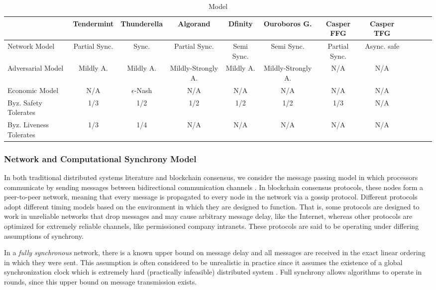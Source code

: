 \documentclass[10pt,journal,compsoc]{IEEEtran}
\newcommand\alberto[1]{\todo[color=yellow,inline]{\textbf{Alberto:} #1}}
\begin{document}
\begin{table*}[htp]
 \caption{Model}
\label{}
\begin{tabularx}{\textwidth}{@{}l*{10}{c}c@{}}
\toprule
                 & Tendermint & Thunderella & Algorand & Dfinity & Ouroboros G. & Casper FFG & Casper TFG\\ 
\midrule
Network Model    & Partial Sync.  & Sync.   & Partial Sync.   & Semi Sync.  & Semi Sync.  & Partial Sync.  & Async. safe  \\
\addlinespace
Adversarial Model & Mildly A.  & Mildly A.  & Mildly-Strongly A.  & Mildly A. & Mildly-Strongly A. & N/A & N/A\\ 
\addlinespace
Economic Model & N/A  & $\epsilon$-Nash  & N/A &  N/A & N/A &  N/A & N/A\\ 
\addlinespace
Byz. Safety Tolerates & 1/3  & 1/2  & 1/2 &  1/2 & 1/2 & 1/3 & N/A\\ 

\addlinespace
Byz. Liveness Tolerates & 1/3  & 1/4  & N/A &  N/A & N/A &  N/A & N/A\\ 

\bottomrule
\end{tabularx}
\end{table*}

\subsubsection{Network and Computational Synchrony Model}
In both traditional distributed systems literature and blockchain consensus, we consider the message passing model in which processors communicate by sending messages between bidirectional communication channels \cite{AttiyaWelch}. In blockchain consensus protocols, these nodes form a peer-to-peer network, meaning that every message is propagated to every node in the network via a gossip protocol. Different protocols adopt different timing models based on the environment in which they are designed to function. That is, some protocols are designed to work in unreliable networks that drop messages and may cause arbitrary message delay, like the Internet, whereas other protocols are optimized for extremely reliable channels, like permissioned company intranets. \alberto{Cite permissioned ledgers.} These protocols are said to be operating under differing assumptions of synchrony.  


In a \emph{fully synchronous} network, there is a known upper bound on message delay and all messages are received in the exact linear ordering in which they were sent. This assumption is often considered to be unrealistic in practice since it assumes the existence of a global synchronization clock which is extremely hard (practically infeasible) distributed system \cite{Mahnush}. Full synchrony allows algorithms to operate in rounds, since this upper bound on message transmission exists. 
\end{document}

